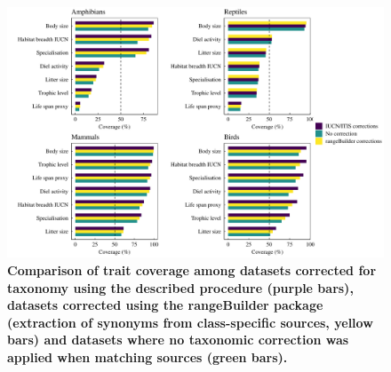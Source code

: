 \begin{figure}[h!]
\centering
\includegraphics[scale=0.6]{Supporting/Chapter2/Figures/Coverage/DeltaCov_F3}
\caption[]{\textbf{Comparison of trait coverage among datasets corrected for taxonomy using the described procedure (purple bars), datasets corrected using the rangeBuilder package (extraction of synonyms from class-specific sources, yellow bars) and datasets where no taxonomic correction was applied when matching sources (green bars).}}
\label{}
\end{figure}